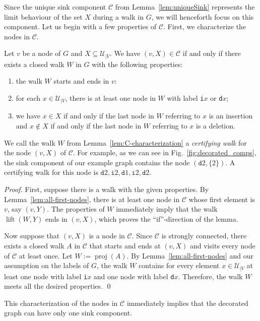 \documentclass[oribibl,envcountsect,envcountsame]{llncs}
\DeclareMathOperator{\pj}{proj}
\DeclareMathOperator{\lt}{lift}
\newcommand{\C}{\mathcal C}
\newcommand{\U}{\mathcal U}
\newcommand{\eqdef}{:=}
\begin{document}
Since the unique sink component $\C$ 
from Lemma~\ref{lem:uniqueSink} represents the
limit behaviour of the set $X$ during a walk in $G$, we will
henceforth focus on this component.
Let us begin with a few properties of $\C$.
First, we characterize the nodes in $\C$.
\begin{lemma}\label{lem:C-characterization}
Let $v$ be a node of $G$ and $X \subseteq \U_{|V}$. We have
$(v, X) \in \C$ if and only if there exists a closed walk $W$ in $G$ 
with the following properties:
\begin{enumerate}
  \item the walk $W$ starts and ends in $v$:
  \item for each $x \in \U_{|V}$, there is at least one node in $W$ with
     label \texttt{i}$x$ or \texttt{d}$x$;
  \item we have $x \in X$ if and only  if the last node in $W$ referring 
  to $x$ is an insertion and $x \not\in X$ if and only if the last node 
	in $W$ referring to $x$ is a deletion.
\end{enumerate}
\end{lemma}

\noindent
We call the walk $W$ from Lemma~\ref{lem:C-characterization}
a \emph{certifying walk} for the node $(v, X)$ of $\C$.
For example, as we can see in Fig.~\ref{fig:decorated_comps},
the sink component of our example graph contains the node
$(\texttt{d}2, \{2\})$. A certifying walk for this node is
$\texttt{d}2, \texttt{i}2, \texttt{d}1,\texttt{i}2, \texttt{d}2$.
\begin{proof}
First, suppose there is a walk with the given properties.
By Lemma~\ref{lem:all-first-nodes}, there is at least one  node 
in $\C$ whose first element is $v$, say $(v, Y)$. 
The properties of $W$ immediately imply that 
the walk $\lt(W, Y)$ ends in $(v, X)$, which proves the 
``if''-direction of the lemma.

Now suppose that $(v,X)$ is a node in $\C$. Since $\C$ is strongly connected,
there exists a closed walk $A$ in $\C$ that starts and ends at $(v,X)$ and
visits every node of $\C$ at least once. Let $W \eqdef \pj(A)$. 
By Lemma~\ref{lem:all-first-nodes} and our assumption on the labels
of $G$, the walk $W$ contains for every element $x \in \U_{|V}$ 
at least one node
with label \texttt{i}$x$ and one node with label \texttt{d}$x$.
Therefore, the walk $W$ meets all the desired properties.
\qed\end{proof}

This characterization of the nodes in $\C$ immediately implies
that the decorated graph can have only one sink component.
\end{document}
